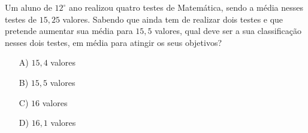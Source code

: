 Um aluno de $12^{\circ}$ ano realizou quatro testes de Matemática, sendo a média nesses testes de $15,25$ valores. Sabendo que ainda tem de realizar dois testes e que pretende aumentar sua média para $15,5$ valores, qual deve ser a sua classificação nesses dois testes, em média para atingir os seus objetivos? 
\begin{enumerate}
\item [A)] $15,4$ valores
\item [B)] $15,5$ valores
\item [C)] $16$ valores
\item [D)] $16,1$ valores
\end{enumerate}
